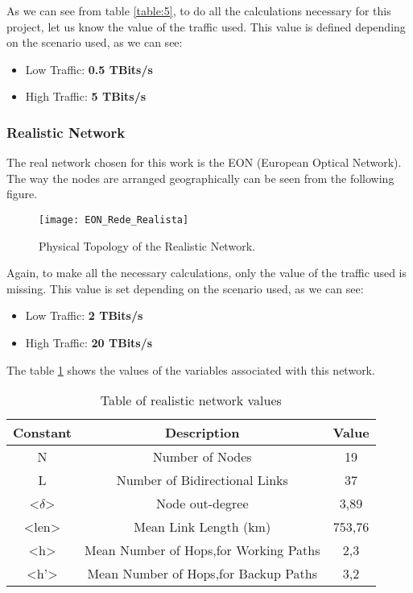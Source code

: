 As we can see from table \ref{table:5}, to do all the calculations necessary for this project, let us know the value of the traffic used. This value is defined depending on the scenario used, as we can see:
\begin{itemize}
  \item Low Traffic: \textbf{0.5 TBits/s}
  \item High Traffic: \textbf{5 TBits/s}
\end{itemize}

\subsubsection{Realistic Network}
The real network chosen for this work is the EON (European Optical Network). \\
The way the nodes are arranged geographically can be seen from the following figure.

\begin{figure}[h!]
\centering
\texttt{[image: EON\_Rede\_Realista]}
\caption{Physical Topology of the Realistic Network.}
\end{figure}


Again, to make all the necessary calculations, only the value of the traffic used is missing. This value is set depending on the scenario used, as we can see:

\begin{itemize}
  \item Low Traffic: \textbf{2 TBits/s}
  \item High Traffic: \textbf{20 TBits/s}
\end{itemize}

\begin{table}[h!]
The table \ref{table:6} shows the values of the variables associated with this network.\vspace{10pt}
\centering
\begin{tabular}{|| c | c | c||}
 \hline
 Constant & Description & Value \\
 \hline\hline
 N & Number of Nodes & 19 \\
 L & Number of Bidirectional Links & 37 \\
 <$\delta$> & Node out-degree & 3,89 \\
 <len> & Mean Link Length (km) & 753,76 \\
 <h> & Mean Number of Hops,for Working Paths & 2,3 \\
 <h'> & Mean Number of Hops,for Backup Paths & 3,2 \\
 \hline
\end{tabular}
\caption{Table of realistic network values}
\label{table:6}
\end{table}

